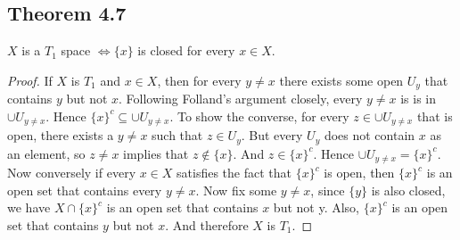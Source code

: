 \documentclass[../../main.tex]{subfiles}
\begin{document}
\subsection{Theorem 4.7}
\begin{wts}
$X$ is a $T_1$ space $\iff \{x\}$ is closed for every $x\in X$.
\end{wts}
\begin{proof}
If $X$ is $T_1$ and $x\in X$, then for every $y\neq x$ there exists some open $U_y$ that contains $y$ but not $x$. Following Folland's argument closely, every $y\neq x$ is is in $\cup U_{y\neq x}$. Hence $\{x\}^c\subseteq \cup U_{y\neq x}$. To show the converse, for every $z\in\cup U_{y\neq x}$ that is open, there exists a $y\neq x$ such that $z\in U_y$. But every $U_y$ does not contain $x$ as an element, so $z\neq x$ implies that $z\notin \{x\}$. And $z\in \{x\}^c$. Hence $\cup U_{y\neq x} = \{x\}^c$.\\

Now conversely if every $x\in X$ satisfies the fact that $\{x\}^c$ is open, then $\{x\}^c$ is an open set that contains every $y\neq x$. Now fix some $y\neq x$, since $\{y\}$ is also closed, we have $X\cap \{x\}^c$ is an open set that contains $x$ but not y. Also, $\{x\}^c$ is an open set that contains $y$ but not $x$. And therefore $X$ is $T_1$.
\end{proof}
\end{document}

